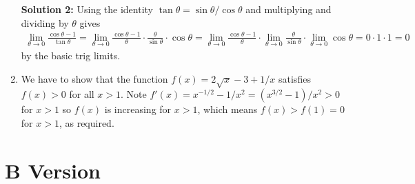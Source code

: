 \documentclass{article}
\newcommand{\ds}{\displaystyle}
\begin{document}
\begin{enumerate}
  \textbf{Solution 2:} Using the identity $\tan\theta = \sin\theta/\cos\theta$
  and multiplying and dividing by $\theta$ gives
  \begin{align*}
    \lim_{\theta\to 0} \frac{\cos\theta-1}{\tan\theta}
    = \lim_{\theta\to 0} \frac{\cos\theta-1}{\theta}
    \cdot \frac{\theta}{\sin\theta} \cdot \cos\theta
    = \lim_{\theta\to 0} \frac{\cos\theta-1}{\theta}
    \cdot \lim_{\theta\to 0}\frac{\theta}{\sin\theta} \cdot 
    \lim_{\theta\to 0} \cos\theta
    = 0 \cdot 1 \cdot 1 = 0
  \end{align*}
  by the basic trig limits.
\item We have to show that the function $\ds f(x)=2\sqrt{x}-3+1/x$ satisfies
  $f(x)>0$ for all $x>1$.  Note
  $f'(x)=x^{-1/2} - 1/x^2 = (x^{3/2}-1)/x^2 >0$ for $x>1$ so $f(x)$ is 
  increasing for $x>1$, which means $f(x)>f(1)=0$ for $x>1$, as required.
\end{enumerate}


\section{B Version}
\end{document}
